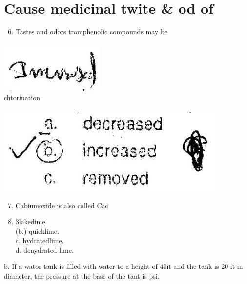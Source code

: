 \documentclass[10pt]{article}
\begin{document}
\section{Cause medicinal twite \& od of}
\begin{enumerate}
  \setcounter{enumi}{5}
  \item Tastes and odors tromphenolic compounds may be
\end{enumerate}

\includegraphics[max width=\textwidth]{2022_11_11_ca6a6c1a0324ee23e523g-02}\\
chtorination.

\includegraphics[max width=\textwidth]{2022_11_11_ca6a6c1a0324ee23e523g-02(1)}

\begin{enumerate}
  \setcounter{enumi}{6}
  \item Cabiumoxide is also called Cao
  \item 3lakedime.\\
(b.) quicklime.\\
c. hydratedlime.\\
d. denydrated lime.
\end{enumerate}

b. If a wator tank is filled with water to a height of $40 \mathrm{it}$ and the tank is 20 it in diameter, the pressure at the base of the tant is psi.
\end{document}
